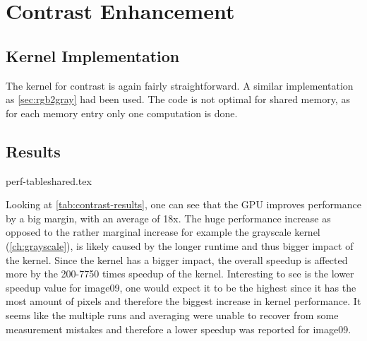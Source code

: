 \documentclass[final]{report}
\begin{document}
\chapter{Contrast Enhancement}

\section{Kernel Implementation}
The kernel for contrast is again fairly straightforward.
A similar implementation as \cref{sec:rgb2gray} had been used.
The code is not optimal for shared memory, as for each memory entry only one computation is done.

\section{Results}
{perf-tableshared.tex}

Looking at \cref{tab:contrast-results}, one can see that the GPU improves performance by a big margin, with an average of 18x.
The huge performance increase as opposed to the rather marginal increase for example the grayscale kernel (\cref{ch:grayscale}), is likely caused by the longer runtime and thus bigger impact of the kernel.
Since the kernel has a bigger impact, the overall speedup is affected more by the 200-7750 times speedup of the kernel.
Interesting to see is the lower speedup value for image09, one would expect it to be the highest since it has the most amount of pixels and therefore the biggest increase in kernel performance.
It seems like the multiple runs and averaging were unable to recover from some measurement mistakes and therefore a lower speedup was reported for image09.
\end{document}
